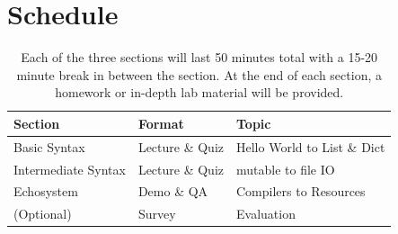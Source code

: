\documentclass{tufte-handout}
\begin{document}
\section{Schedule}\label{sec:schedule}
\begin{table}[ht]
  \selectfont
  \begin{tabular}{lll}
    \toprule
    Section & Format & Topic \\
    \midrule
    Basic Syntax & Lecture \& Quiz & Hello World to List \& Dict \\
    Intermediate Syntax & Lecture \& Quiz & mutable to file IO \\
    Echosystem & Demo \& QA & Compilers to Resources \\
    (Optional) & Survey & Evaluation \\
    \bottomrule
  \end{tabular}
  \caption{Each of the three sections will last 50 minutes total with a
    15-20 minute break in between the section. At the
    end of each section, a homework or in-depth lab material will be
    provided.}
  \label{tab:Schedule}
\end{table}
\end{document}

